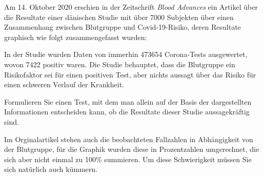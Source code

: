 Am 14. Oktober 2020 erschien in der Zeitschrift {\em Blood Advances}
ein Artikel über die Resultate einer dänischen Studie mit über 7000
Subjekten über einen Zusammenhang zwischen Blutgruppe und Covid-19-Risiko,
deren Resultate graphisch wie folgt zusammengefasst wurden:
\begin{center}
\end{center}
In der Studie wurden Daten von immerhin 473654 Corona-Tests ausgewertet,
wovon 7422 positiv waren.
Die Studie behauptet, dass die Blutgruppe ein Risikofaktor sei für einen
positiven Test, aber nichts aussagt über das Risiko für einen schweren
Verlauf der Krankheit.

Formulieren Sie einen Test, mit dem man allein auf der
Basis der dargestellten Informationen entscheiden kann, ob
die Resultate dieser Studie aussagekräftig sind.

\begin{hinweis}
Im Orginalartikel stehen auch die beobachteten Fallzahlen in Abhängigkeit
von der Blutgruppe, für die Graphik wurden diese in Prozentzahlen umgerechnet,
die sich aber nicht einmal zu 100\% summieren.
Um diese Schwierigkeit müssen Sie sich natürlich auch kümmern.
\end{hinweis}


